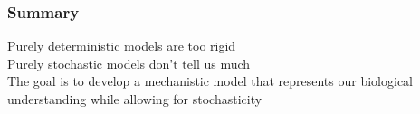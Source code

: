 \documentclass[color=usenames,dvipsnames]{beamer}\usepackage[]{graphicx}\usepackage[]{color}
\begin{document}
\begin{frame}
  \frametitle{Summary}
  \Large
  Purely deterministic models are too rigid \\
  \vfill
  Purely stochastic models don't tell us much \\
  \vfill
  The goal is to develop a mechanistic model that represents 
  our biological understanding while allowing for stochasticity \\
\end{frame}














\end{document}
